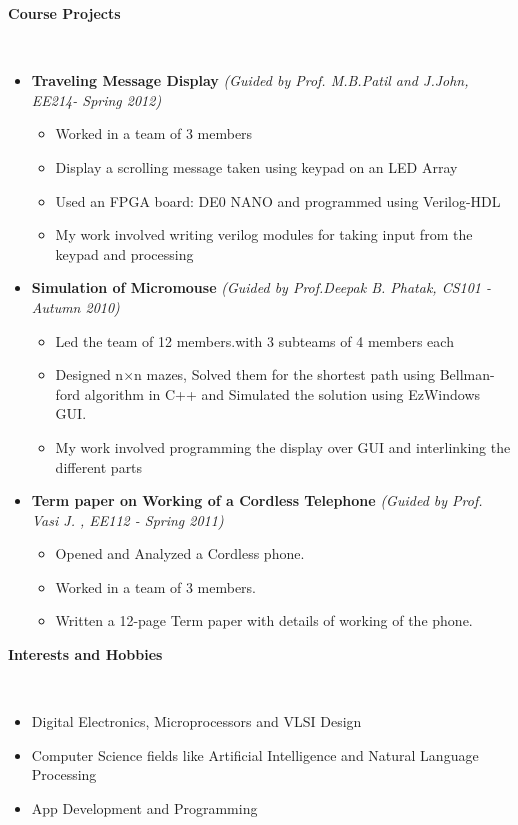 \documentclass[a4paper,11pt]{article}
\newcommand{\isep}{-2 pt}
\newcommand{\lsep}{-0.5cm}
\newcommand{\resheading}[1]{{\small \colorbox{mygrey}{\begin{minipage}{0.975\textwidth}{\textbf{#1 \vphantom{p\^{E}}}}\end{minipage}}}}
\begin{document}
\resheading{\textbf{\large Course Projects}}\\[\lsep]
\begin{itemize}
\item \textbf{Traveling Message Display} \emph{(Guided by Prof. M.B.Patil and J.John, EE214- Spring 2012)}\\[-0.6cm]
    \begin{itemize}\itemsep \isep
        \item Worked in a team of 3 members
        \item Display a scrolling message taken using keypad on an LED Array
        \item Used an FPGA board: DE0 NANO and programmed using Verilog-HDL
        \item My work involved writing verilog modules for taking input from the keypad and processing
    \end{itemize}
    	\item \textbf{Simulation of Micromouse} \emph{(Guided by Prof.Deepak B. Phatak, CS101 - Autumn 2010)}\\[-0.6cm]
	\begin{itemize}\itemsep \isep 
	    \item Led the team of 12 members.with 3 subteams of 4 members each
	    \item Designed n$\times$n mazes, Solved them for the shortest path using Bellman-ford algorithm in C++ and Simulated the solution using EzWindows GUI.
	    \item My work involved programming the display over GUI and interlinking the different parts
	\end{itemize} 
\item \textbf{Term paper on Working of a Cordless Telephone} \emph{(Guided by Prof. Vasi J. , EE112 - Spring 2011)\\[-0.6cm]}
	\begin{itemize} \itemsep \isep
	  \item Opened and Analyzed a Cordless phone.
	  \item Worked in a team of 3 members.
	  \item Written a 12-page Term paper with details of working of the phone.
	\end{itemize}
\end{itemize}

\resheading{\textbf{\large Interests and Hobbies}} \\[\lsep] 
\begin{itemize} \itemsep \isep
    \item Digital Electronics, Microprocessors and VLSI Design
    \item Computer Science fields like Artificial Intelligence and Natural Language Processing
    \item App Development and Programming
\end{itemize}
\end{document}

